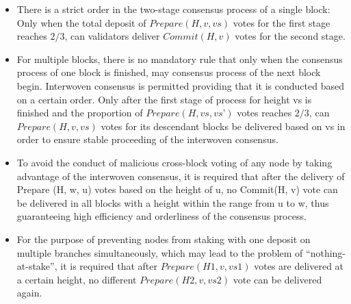 \begin{itemize}
\item There is a strict order in the two-stage consensus process of a single block: Only when the total deposit of $Prepare(H, v, vs)$ votes for the first stage reaches $2/3$, can validators deliver $Commit(H, v)$ votes for the second stage.

\item For multiple blocks, there is no mandatory rule that only when the consensus process of one block is finished, may consensus process of the next block begin. Interwoven consensus is permitted providing that it is conducted based on a certain order. Only after the first stage of process for height vs is finished and the proportion of $Prepare(H, vs, vs’)$ votes reaches $2/3$, can $Prepare(H, v, vs)$ votes for its descendant blocks be delivered based on vs in order to ensure stable proceeding of the interwoven consensus.

\item To avoid the conduct of malicious cross-block voting of any node by taking advantage of the interwoven consensus, it is required that after the delivery of Prepare (H, w, u) votes based on the height of u, no Commit(H, v) vote can be delivered in all blocks with a height within the range from u to w, thus guaranteeing high efficiency and orderliness of the consensus process.

\item For the purpose of preventing nodes from staking with one deposit on multiple branches simultaneously, which may lead to the problem of “nothing-at-stake”, it is required that after $Prepare(H1, v, vs1)$ votes are delivered at a certain height, no different $Prepare(H2, v, vs2)$ vote can be delivered again.
\end{itemize}

